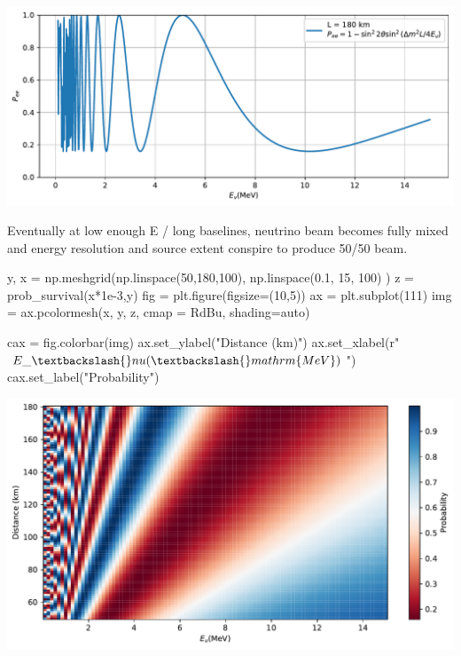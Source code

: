 \documentclass[
  letterpaper,
  DIV=11,
  numbers=noendperiod]{scrreprt}
\newenvironment{Shaded}{\begin{snugshade}}{\end{snugshade}}
\newcommand{\DecValTok}[1]{\textcolor[rgb]{0.68,0.00,0.00}{#1}}
\newcommand{\FloatTok}[1]{\textcolor[rgb]{0.68,0.00,0.00}{#1}}
\newcommand{\NormalTok}[1]{\textcolor[rgb]{0.00,0.23,0.31}{#1}}
\newcommand{\OperatorTok}[1]{\textcolor[rgb]{0.37,0.37,0.37}{#1}}
\newcommand{\StringTok}[1]{\textcolor[rgb]{0.13,0.47,0.30}{#1}}
\newcommand{\VerbatimStringTok}[1]{\textcolor[rgb]{0.13,0.47,0.30}{#1}}
\begin{document}
\begin{tcolorbox}[enhanced jigsaw, toprule=.15mm, colframe=quarto-callout-color-frame, bottomrule=.15mm, leftrule=.75mm, left=2mm, breakable, rightrule=.15mm, arc=.35mm, opacityback=0, colback=white]
\includegraphics{chap3_files/figure-pdf/cell-6-output-1.pdf}

Eventually at low enough E / long baselines, neutrino beam becomes fully
mixed and energy resolution and source extent conspire to produce 50/50
beam.

\begin{Shaded}
\begin{Highlighting}[]
\NormalTok{y, x }\OperatorTok{=}\NormalTok{ np.meshgrid(np.linspace(}\DecValTok{50}\NormalTok{,}\DecValTok{180}\NormalTok{,}\DecValTok{100}\NormalTok{), np.linspace(}\FloatTok{0.1}\NormalTok{, }\DecValTok{15}\NormalTok{, }\DecValTok{100}\NormalTok{) )}
\NormalTok{z }\OperatorTok{=}\NormalTok{ prob\_survival(x}\OperatorTok{*}\FloatTok{1e{-}3}\NormalTok{,y)}
\NormalTok{fig }\OperatorTok{=}\NormalTok{ plt.figure(figsize}\OperatorTok{=}\NormalTok{(}\DecValTok{10}\NormalTok{,}\DecValTok{5}\NormalTok{))}
\NormalTok{ax }\OperatorTok{=}\NormalTok{ plt.subplot(}\DecValTok{111}\NormalTok{)}
\NormalTok{img }\OperatorTok{=}\NormalTok{ ax.pcolormesh(x, y, z, cmap }\OperatorTok{=} \StringTok{\textquotesingle{}RdBu\textquotesingle{}}\NormalTok{, shading}\OperatorTok{=}\StringTok{\textquotesingle{}auto\textquotesingle{}}\NormalTok{)}

\NormalTok{cax }\OperatorTok{=}\NormalTok{ fig.colorbar(img)}
\NormalTok{ax.set\_ylabel(}\StringTok{"Distance (km)"}\NormalTok{)}
\NormalTok{ax.set\_xlabel(}\VerbatimStringTok{r"$E\_\textbackslash{}nu (\textbackslash{}mathrm\{ MeV\})$"}\NormalTok{)}
\NormalTok{cax.set\_label(}\StringTok{"Probability"}\NormalTok{)}
\end{Highlighting}
\end{Shaded}

\includegraphics{chap3_files/figure-pdf/cell-7-output-1.pdf}


\end{tcolorbox}
\end{document}
